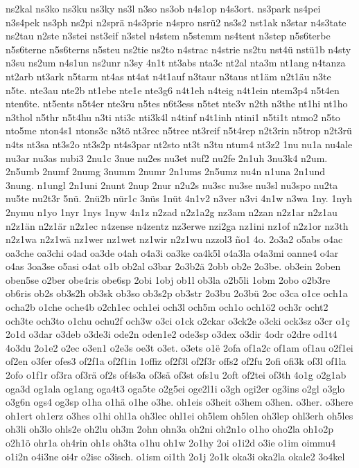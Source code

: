 {ns2kal
ns3ko
ns3ku
ns3ky
ns3l
n3so
ns3ob
n4s1op
n4s3ort.
ns3park
ns4pei
n3s4pek
ns3ph
ns2pi
n2sprä
n4s3prie
n4spro
nsrü2
ns3s2
nst1ak
n3star
n4s3tate
ns2tau
n2ste
n3stei
nst3eif
n3stel
n4stem
n5stemm
ns4tent
n3step
n5s6terbe
n5s6terne
n5s6terns
n5steu
ns2tie
ns2to
n4strac
n4strie
ns2tu
nst4ü
nstü1b
n4sty
n3su
ns2um
n4s1un
ns2unr
n3sy
4n1t
nt3abs
nta3c
nt2al
nta3m
nt1ang
n4tanza
nt2arb
nt3ark
n5tarm
nt4as
nt4at
n4t1auf
n3taur
n3taus
nt1äm
n2t1äu
n3te
n5te.
nte3au
nte2b
nt1ebe
nte1e
nte3g6
n4t1eh
n4teig
n4t1ein
ntem3p4
n5t4en
nten6te.
nt5ents
n5t4er
nte3ru
n5tes
n6t3ess
n5tet
nte3v
n2th
n3the
nt1hi
nt1ho
n3thol
n5thr
n5t4hu
n3ti
nti3c
nti3k4l
n4tinf
n4t1inh
ntini1
n5ti1t
ntmo2
n5to
nto5me
nton4s1
ntons3c
n3tö
nt3rec
n5tree
nt3reif
n5t4rep
n2t3rin
n5trop
n2t3rü
n4ts
nt3sa
nt3s2o
nt3s2p
nt4s3par
nt2sto
nt3t
n3tu
ntum4
nt3z2
1nu
nu1a
nu4ale
nu3ar
nu3as
nubi3
2nu1c
3nue
nu2es
nu3et
nuf2
nu2fe
2n1uh
3nu3k4
n2um.
2n5umb
2numf
2numg
3numm
2numr
2n1ums
2n5umz
nu4n
n1una
2n1und
3nung.
n1ungl
2n1uni
2nunt
2nup
2nur
n2u2s
nu3sc
nu3se
nu3sl
nu3spo
nu2ta
nu5te
nu2t3r
5nü.
2nü2b
nür1c
3nüs
1nüt
4n1v2
n3ver
n3vi
4n1w
n3wa
1ny.
1nyh
2nymu
n1yo
1nyr
1nys
1nyw
4n1z
n2zad
n2z1a2g
nz3am
n2zan
n2z1ar
n2z1au
n2z1än
n2z1är
n2z1ec
n4zense
n4zentz
nz3erwe
nzi2ga
nz1ini
nz1of
n2z1or
nz3th
n2z1wa
n2z1wä
nz1wer
nz1wet
nz1wir
n2z1wu
nzzol3
ño1
4o.
2o3a2
o5abs
o4ac
oa3che
oa3chi
o4ad
oa3de
o4ah
o4a3i
oa3ke
oa4k5l
o4a3la
o4a3mi
oanne4
o4ar
o4as
3oa3se
o5asi
o4at
o1b
ob2al
o3bar
2o3b2ä
2obb
ob2e
2o3be.
ob3ein
2oben
oben5se
o2ber
obe4ris
obe6sp
2obi
1obj
ob1l
ob3la
o2b5li
1obm
2obo
o2b3re
ob6ris
ob2s
ob3s2h
ob3sk
ob3so
ob3s2p
ob3str
2o3bu
2o3bü
2oc
o3ca
o1ce
och1a
ocha2b
o1che
oche4b
o2ch1ec
och1ei
och3l
och5m
och1o
och1ö2
och3r
ocht2
och3te
och3to
o1chu
ochu2f
och3w
o3ci
o1ck
o2ckar
o3ck2e
o3cki
ock3sz
o3cr
o1ç
2o1d
o3dar
o3deb
o3de3i
ode2n
oden1e2
ode3sp
o3dex
o3dir
4odr
o2dre
od1t4
4o3du
2o1e2
o2ec
o3en1
o2e3s
oe3t
o3et.
o3ets
o1ë
2ofa
of1a2c
of1am
of1au
o2f1ei
of2en
o3fer
ofes3
of2f1a
of2f1in
1offiz
of2f3l
of2f3r
offs2
of2fu
2ofi
ofi3k
of3l
of1la
2ofo
o1f1r
of3ra
of3rä
of2s
of4s3a
of3sä
of3st
ofs1u
2oft
of2tei
of3th
4o1g
o2g1ab
oga3d
og1ala
og1ang
oga4t3
oga5te
o2g5ei
oge2l1i
o3gh
ogi2er
og3ins
o2gl
o3glo
o3g6n
ogs4
og3sp
o1ha
o1hä
o1he
o3he.
oh1eis
o3heit
o3hem
o3hen.
o3her.
o3here
oh1ert
oh1erz
o3hes
o1hi
ohl1a
oh3lec
ohl1ei
oh5lem
oh5len
oh3lep
ohl3erh
oh5les
oh3li
oh3lo
ohls2e
oh2lu
oh3m
2ohn
ohn3a
oh2ni
oh2n1o
o1ho
oho2la
oh1o2p
o2h1ö
ohr1a
oh4rin
oh1s
oh3ta
o1hu
oh1w
2o1hy
2oi
o1i2d
o3ie
o1im
oimmu4
o1i2n
o4i3ne
oi4r
o2isc
o3isch.
o1ism
oi1th
2o1j
2o1k
oka3i
oka2la
okale2
3o4kel
}
